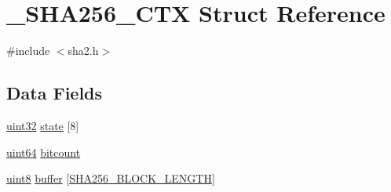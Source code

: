\hypertarget{struct__SHA256__CTX}{\section{\-\_\-\-S\-H\-A256\-\_\-\-C\-T\-X Struct Reference}
\label{struct__SHA256__CTX}
}


{\ttfamily \#include $<$sha2.\-h$>$}

\subsection*{Data Fields}
\begin{DoxyCompactItemize}
\item 
\hyperlink{c_8h_a1134b580f8da4de94ca6b1de4d37975e}{uint32} \hyperlink{struct__SHA256__CTX_a0735cc1e8e2d7e0f2fc54cec5c05b1d3}{state} \mbox{[}8\mbox{]}
\item 
\hyperlink{c_8h_af68cb4c1926b997d49286c1e0c7fa68a}{uint64} \hyperlink{struct__SHA256__CTX_ae03d7f91de6eb6cb110d3d054e58d935}{bitcount}
\item 
\hyperlink{c_8h_adde6aaee8457bee49c2a92621fe22b79}{uint8} \hyperlink{struct__SHA256__CTX_ae1c9099b16619b706dbc88203ce3c189}{buffer} \mbox{[}\hyperlink{sha2_8h_af7a1879c2d7cd5cf31c91c0eb91b0015}{S\-H\-A256\-\_\-\-B\-L\-O\-C\-K\-\_\-\-L\-E\-N\-G\-T\-H}\mbox{]}
\end{DoxyCompactItemize}


